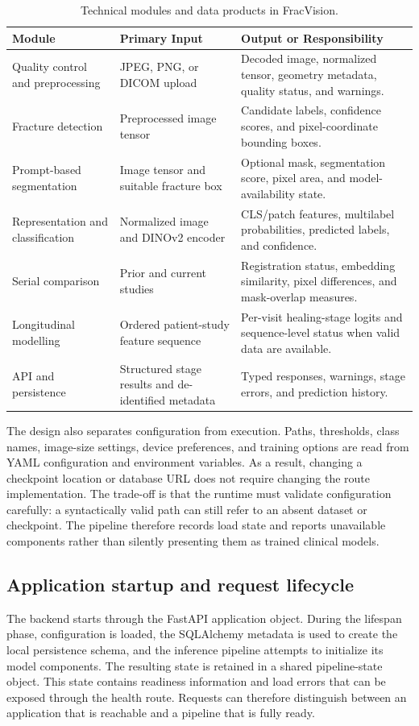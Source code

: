 \documentclass[12pt,a4paper]{article}
\begin{document}
\begin{table}[H]
\centering
\small
\caption{Technical modules and data products in FracVision.}
\label{tab:technical-modules}
\begin{tabularx}{\textwidth}{|p{}|p{}|X|}
\hline
\textbf{Module} & \textbf{Primary Input} & \textbf{Output or Responsibility}\\\hline
Quality control and preprocessing & JPEG, PNG, or DICOM upload & Decoded image, normalized tensor, geometry metadata, quality status, and warnings.\\\hline
Fracture detection & Preprocessed image tensor & Candidate labels, confidence scores, and pixel-coordinate bounding boxes.\\\hline
Prompt-based segmentation & Image tensor and suitable fracture box & Optional mask, segmentation score, pixel area, and model-availability state.\\\hline
Representation and classification & Normalized image and DINOv2 encoder & CLS/patch features, multilabel probabilities, predicted labels, and confidence.\\\hline
Serial comparison & Prior and current studies & Registration status, embedding similarity, pixel differences, and mask-overlap measures.\\\hline
Longitudinal modelling & Ordered patient-study feature sequence & Per-visit healing-stage logits and sequence-level status when valid data are available.\\\hline
API and persistence & Structured stage results and de-identified metadata & Typed responses, warnings, stage errors, and prediction history.\\\hline
\end{tabularx}
\end{table}

The design also separates configuration from execution. Paths, thresholds, class names, image-size settings, device preferences, and training options are read from YAML configuration and environment variables. As a result, changing a checkpoint location or database URL does not require changing the route implementation. The trade-off is that the runtime must validate configuration carefully: a syntactically valid path can still refer to an absent dataset or checkpoint. The pipeline therefore records load state and reports unavailable components rather than silently presenting them as trained clinical models.

\subsection{Application startup and request lifecycle}
The backend starts through the FastAPI application object. During the lifespan phase, configuration is loaded, the SQLAlchemy metadata is used to create the local persistence schema, and the inference pipeline attempts to initialize its model components. The resulting state is retained in a shared pipeline-state object. This state contains readiness information and load errors that can be exposed through the health route. Requests can therefore distinguish between an application that is reachable and a pipeline that is fully ready.
\end{document}
